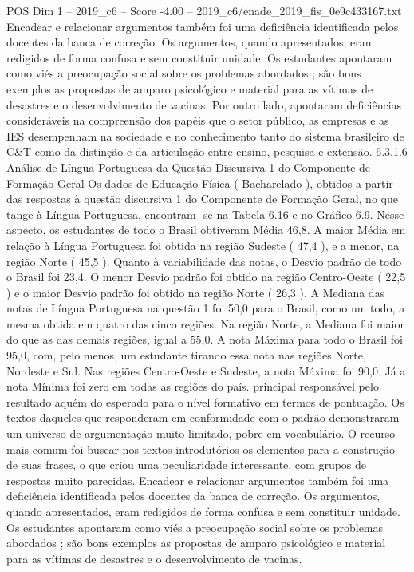 \begin{textsample}{POS Dim 1 – 2019\_c6 – Score -4.00 – 2019\_c6/enade\_2019\_fis\_0e9c433167.txt}
Encadear e relacionar argumentos também foi uma deficiência identificada pelos docentes da banca de correção.
Os argumentos, quando apresentados, eram redigidos de forma confusa e sem constituir unidade.
Os estudantes apontaram como viés a preocupação social sobre os problemas abordados ; são bons exemplos as propostas de amparo psicológico e material para as vítimas de desastres e o desenvolvimento de vacinas.
Por outro lado, apontaram deficiências consideráveis na compreensão dos papéis que o setor público, as empresas e as IES desempenham na sociedade e no conhecimento tanto do sistema brasileiro de C\&T como da distinção e da articulação entre ensino, pesquisa e extensão. 6.3.1.6 Análise de Língua Portuguesa da Questão Discursiva 1 do Componente de Formação Geral Os dados de Educação Física ( Bacharelado ), obtidos a partir das respostas à questão discursiva 1 do Componente de Formação Geral, no que tange à Língua Portuguesa, encontram -se na Tabela 6.16 e no Gráfico 6.9.
Nesse aspecto, os estudantes de todo o Brasil obtiveram Média 46,8.
A maior Média em relação à Língua Portuguesa foi obtida na região Sudeste ( 47,4 ), e a menor, na região Norte ( 45,5 ).
Quanto à variabilidade das notas, o Desvio padrão de todo o Brasil foi 23,4.
O menor Desvio padrão foi obtido na região Centro-Oeste ( 22,5 ) e o maior Desvio padrão foi obtido na região Norte ( 26,3 ).
A Mediana das notas de Língua Portuguesa na questão 1 foi 50,0 para o Brasil, como um todo, a mesma obtida em quatro das cinco regiões.
Na região Norte, a Mediana foi maior do que as das demais regiões, igual a 55,0.
A nota Máxima para todo o Brasil foi 95,0, com, pelo menos, um estudante tirando essa nota nas regiões Norte, Nordeste e Sul.
Nas regiões Centro-Oeste e Sudeste, a nota Máxima foi 90,0.
Já a nota Mínima foi zero em todas as regiões do país. principal responsável pelo resultado aquém do esperado para o nível formativo em termos de pontuação.
Os textos daqueles que responderam em conformidade com o padrão demonstraram um universo de argumentação muito limitado, pobre em vocabulário.
O recurso mais comum foi buscar nos textos introdutórios os elementos para a construção de suas frases, o que criou uma peculiaridade interessante, com grupos de respostas muito parecidas.
Encadear e relacionar argumentos também foi uma deficiência identificada pelos docentes da banca de correção.
Os argumentos, quando apresentados, eram redigidos de forma confusa e sem constituir unidade.
Os estudantes apontaram como viés a preocupação social sobre os problemas abordados ; são bons exemplos as propostas de amparo psicológico e material para as vítimas de desastres e o desenvolvimento de vacinas.

\end{textsample}

